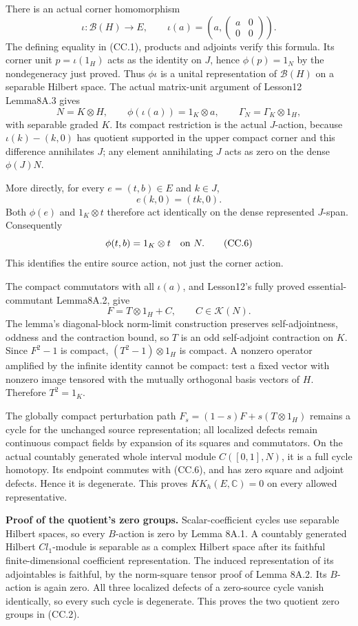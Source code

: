 \documentclass[
  11pt,
]{article}
\begin{document}
There is an actual corner homomorphism \[
 \iota:\mathcal B(H)\longrightarrow E,\qquad
 \iota(a)=\left(a,\begin{pmatrix}a&0\\0&0\end{pmatrix}\right).
 \tag{CC.4}
\] The defining equality in (CC.1), products and adjoints verify this
formula. Its corner unit \(p=\iota(1_H)\) acts as the identity on \(J\),
hence \(\phi(p)=1_N\) by the nondegeneracy just proved. Thus
\(\phi\iota\) is a unital representation of \(\mathcal B(H)\) on a
separable Hilbert space. The actual matrix-unit argument of Lesson12
Lemma8A.3 gives \[
 N=K\otimes H,\qquad
 \phi(\iota(a))=1_K\otimes a,\qquad
 \Gamma_N=\Gamma_K\otimes1_H,
 \tag{CC.5}
\] with separable graded \(K\). Its compact restriction is the actual
\(J\)-action, because \(\iota(k)-(k,0)\) has quotient supported in the
upper compact corner and this difference annihilates \(J\); any element
annihilating \(J\) acts as zero on the dense \(\phi(J)N\).

More directly, for every \(e=(t,b)\in E\) and \(k\in J\), \[
 e(k,0)=(tk,0).
\] Both \(\phi(e)\) and \(1_K\otimes t\) therefore act identically on
the dense represented \(J\)-span. Consequently \[
 \phi(t,b)=1_K\otimes t
 \quad\hbox{on }N .
 \tag{CC.6}
\] This identifies the entire source action, not just the corner action.

The compact commutators with all \(\iota(a)\), and Lesson12's fully
proved essential-commutant Lemma8A.2, give \[
 F=T\otimes1_H+C,\qquad C\in\mathcal K(N).
 \tag{CC.7}
\] The lemma's diagonal-block norm-limit construction preserves
self-adjointness, oddness and the contraction bound, so \(T\) is an odd
self-adjoint contraction on \(K\). Since \(F^2-1\) is compact,
\((T^2-1)\otimes1_H\) is compact. A nonzero operator amplified by the
infinite identity cannot be compact: test a fixed vector with nonzero
image tensored with the mutually orthogonal basis vectors of \(H\).
Therefore \(T^2=1_K\).

The globally compact perturbation path \(F_s=(1-s)F+s(T\otimes1_H)\)
remains a cycle for the unchanged source representation; all localized
defects remain continuous compact fields by expansion of its squares and
commutators. On the actual countably generated whole interval module
\(C([0,1],N)\), it is a full cycle homotopy. Its endpoint commutes with
(CC.6), and has zero square and adjoint defects. Hence it is degenerate.
This proves \(KK_h(E,\mathbb C)=0\) on every allowed representative.

\textbf{Proof of the quotient's zero groups.} Scalar-coefficient cycles
use separable Hilbert spaces, so every \(B\)-action is zero by Lemma
8A.1. A countably generated Hilbert \(Cl_1\)-module is separable as a
complex Hilbert space after its faithful finite-dimensional coefficient
representation. The induced representation of its adjointables is
faithful, by the norm-square tensor proof of Lemma 8A.2. Its
\(B\)-action is again zero. All three localized defects of a zero-source
cycle vanish identically, so every such cycle is degenerate. This proves
the two quotient zero groups in (CC.2).
\end{document}
